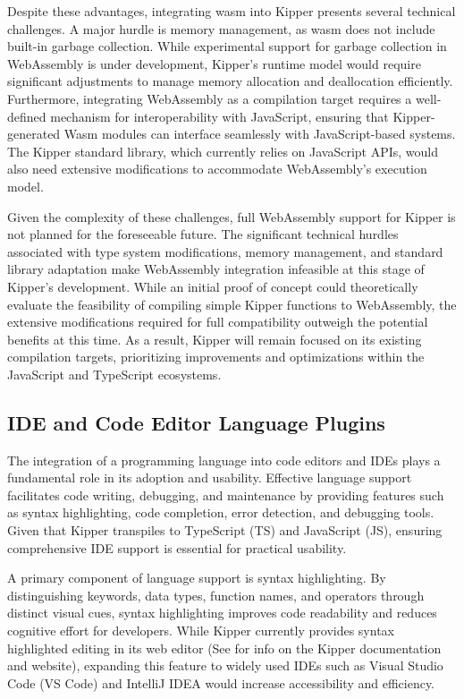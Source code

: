 Despite these advantages, integrating \acrshort{wasm} into Kipper presents several technical challenges. A major hurdle is memory management, as \acrshort{wasm} does not include built-in garbage collection. While experimental support for garbage collection in WebAssembly is under development, Kipper's runtime model would require significant adjustments to manage memory allocation and deallocation efficiently. Furthermore, integrating WebAssembly as a compilation target requires a well-defined mechanism for interoperability with JavaScript, ensuring that Kipper-generated Wasm modules can interface seamlessly with JavaScript-based systems. The Kipper standard library, which currently relies on JavaScript APIs, would also need extensive modifications to accommodate WebAssembly's execution model.

Given the complexity of these challenges, full WebAssembly support for Kipper is not planned for the foreseeable future. The significant technical hurdles associated with type system modifications, memory management, and standard library adaptation make WebAssembly integration infeasible at this stage of Kipper's development. While an initial proof of concept could theoretically evaluate the feasibility of compiling simple Kipper functions to WebAssembly, the extensive modifications required for full compatibility outweigh the potential benefits at this time. As a result, Kipper will remain focused on its existing compilation targets, prioritizing improvements and optimizations within the JavaScript and TypeScript ecosystems.

\subsection{IDE and Code Editor Language Plugins}

The integration of a programming language into code editors and IDEs plays a fundamental role in its adoption and usability. Effective language support facilitates code writing, debugging, and maintenance by providing features such as syntax highlighting, code completion, error detection, and debugging tools. Given that Kipper \gls{transpile}s to TypeScript (TS) and JavaScript (JS), ensuring comprehensive IDE support is essential for practical usability.

A primary component of language support is syntax highlighting. By distinguishing keywords, data types, function names, and operators through distinct visual cues, syntax highlighting improves code readability and reduces cognitive effort for developers. While Kipper currently provides syntax highlighted editing in its web editor (See  for info on the Kipper documentation and website), expanding this feature to widely used IDEs such as Visual Studio Code (VS Code) and IntelliJ IDEA would increase accessibility and efficiency.

